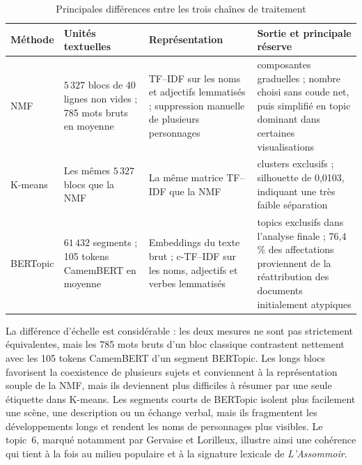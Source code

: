 {\small
\begin{table}[H]
    \centering
    \renewcommand{\arraystretch}{1.18}
    \caption{Principales différences entre les trois chaînes de traitement}
    \label{tab:comparaison-pipelines-topic-modeling}
    \begin{tabularx}{\textwidth}{
        >{\raggedright\arraybackslash}p{}
        >{\raggedright\arraybackslash}p{}
        >{\raggedright\arraybackslash}p{}
        >{\raggedright\arraybackslash}X}
        \toprule
        \textbf{Méthode} & \textbf{Unités textuelles} & \textbf{Représentation} & \textbf{Sortie et principale réserve} \\
        \midrule
        NMF & \(5\,327\) blocs de 40 lignes non vides ; 785 mots bruts en moyenne & TF--IDF sur les noms et adjectifs lemmatisés ; suppression manuelle de plusieurs personnages & 29 composantes graduelles ; nombre choisi sans coude net, puis simplifié en topic dominant dans certaines visualisations \\
        K-means & Les mêmes \(5\,327\) blocs que la NMF & La même matrice TF--IDF que la NMF & 29 clusters exclusifs ; silhouette de 0,0103, indiquant une très faible séparation \\
        BERTopic & \(61\,432\) segments ; 105 tokens CamemBERT en moyenne & Embeddings du texte brut ; c-TF--IDF sur les noms, adjectifs et verbes lemmatisés & 17 topics exclusifs dans l'analyse finale ; 76,4\,\% des affectations proviennent de la réattribution des documents initialement atypiques \\
        \bottomrule
    \end{tabularx}
\end{table}
}

La différence d'échelle est considérable : les deux mesures ne sont pas strictement équivalentes, mais les 785 mots bruts d'un bloc classique contrastent nettement avec les 105 tokens CamemBERT d'un segment BERTopic. Les longs blocs favorisent la coexistence de plusieurs sujets et conviennent à la représentation souple de la NMF, mais ils deviennent plus difficiles à résumer par une seule étiquette dans K-means. Les segments courts de BERTopic isolent plus facilement une scène, une description ou un échange verbal, mais ils fragmentent les développements longs et rendent les noms de personnages plus visibles. Le topic~6, marqué notamment par Gervaise et Lorilleux, illustre ainsi une cohérence qui tient à la fois au milieu populaire et à la signature lexicale de \textit{L'Assommoir}.

